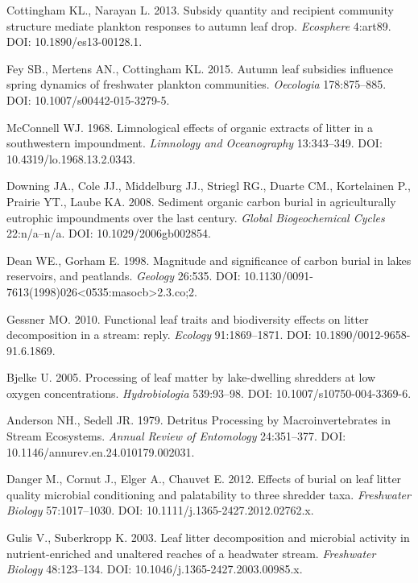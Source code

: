 \documentclass[12pt,letter]{article}
\begin{document}
\label{csl:39}Cottingham KL., Narayan L. 2013. {Subsidy quantity and recipient community structure mediate plankton responses to autumn leaf drop}. \textit{Ecosphere} 4:art89. DOI: 10.1890/es13-00128.1.

\label{csl:40}Fey SB., Mertens AN., Cottingham KL. 2015. {Autumn leaf subsidies influence spring dynamics of freshwater plankton communities}. \textit{Oecologia} 178:875–885. DOI: 10.1007/s00442-015-3279-5.

\label{csl:41}McConnell WJ. 1968. {{Limnological} {effects} {of} {organic} {extracts} {of} {litter} {in} a {southwestern} {impoundment}}. \textit{Limnology and Oceanography} 13:343–349. DOI: 10.4319/lo.1968.13.2.0343.

\label{csl:42}Downing JA., Cole JJ., Middelburg JJ., Striegl RG., Duarte CM., Kortelainen P., Prairie YT., Laube KA. 2008. {Sediment organic carbon burial in agriculturally eutrophic impoundments over the last century}. \textit{Global Biogeochemical Cycles} 22:n/a--n/a. DOI: 10.1029/2006gb002854.

\label{csl:43}Dean WE., Gorham E. 1998. {Magnitude and significance of carbon burial in lakes reservoirs, and peatlands}. \textit{Geology} 26:535. DOI: 10.1130/0091-7613(1998)026<0535:masocb>2.3.co;2.

\label{csl:44}Gessner MO. 2010. {Functional leaf traits and biodiversity effects on litter decomposition in a stream: reply}. \textit{Ecology} 91:1869–1871. DOI: 10.1890/0012-9658-91.6.1869.

\label{csl:45}Bjelke U. 2005. {Processing of leaf matter by lake-dwelling shredders at low oxygen concentrations}. \textit{Hydrobiologia} 539:93–98. DOI: 10.1007/s10750-004-3369-6.

\label{csl:46}Anderson NH., Sedell JR. 1979. {Detritus Processing by Macroinvertebrates in Stream Ecosystems}. \textit{Annual Review of Entomology} 24:351–377. DOI: 10.1146/annurev.en.24.010179.002031.

\label{csl:47}Danger M., Cornut J., Elger A., Chauvet E. 2012. {Effects of burial on leaf litter quality microbial conditioning and palatability to three shredder taxa}. \textit{Freshwater Biology} 57:1017–1030. DOI: 10.1111/j.1365-2427.2012.02762.x.

\label{csl:48}Gulis V., Suberkropp K. 2003. {Leaf litter decomposition and microbial activity in nutrient-enriched and unaltered reaches of a headwater stream}. \textit{Freshwater Biology} 48:123–134. DOI: 10.1046/j.1365-2427.2003.00985.x.
\end{document}

